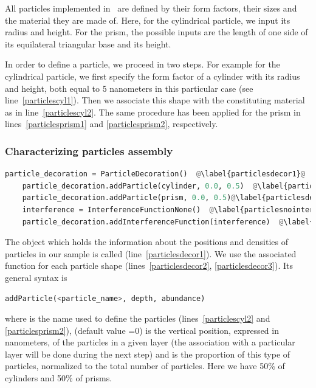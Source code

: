 All particles implemented in \BornAgain\ are defined by their
form factors, their sizes and the material
they are made of. Here, for the
cylindrical particle, we input its radius and height.  For the prism, 
the possible inputs are the length of one side of its equilateral triangular
base and its height.

In order to define a particle, we proceed in two steps. For example for
the cylindrical particle, we first specify the form factor of a cylinder with 
its radius and height, both equal to 5 nanometers in this particular
case (see line~\ref{particlescyl1}). Then we associate this shape with
the constituting material as in line~\ref{particlescyl2}.
The same procedure has been applied for the prism in lines~\ref{particlesprism1} and \ref{particlesprism2}, respectively.


%
\subsubsection{Characterizing particles assembly} 
\begin{lstlisting}[language=python, style=eclipseboxed, name=ex1,nolol]
    particle_decoration = ParticleDecoration()  @\label{particlesdecor1}@
    particle_decoration.addParticle(cylinder, 0.0, 0.5)  @\label{particlesdecor2}@
    particle_decoration.addParticle(prism, 0.0, 0.5)@\label{particlesdecor3}@
    interference = InterferenceFunctionNone()  @\label{particlesnointerf}@
    particle_decoration.addInterferenceFunction(interference)  @\label{particlesinterf}@
\end{lstlisting}
The object which holds the information about the positions and densities of particles
in our sample is called 
(line~\ref{particlesdecor1}). We use the associated function 
for each particle shape (lines~\ref{particlesdecor2}, \ref{particlesdecor3}). Its general syntax is 

\begin{lstlisting}[language=python, style=eclipse,numbers=none]
addParticle(<particle_name>, depth, abundance) 
\end{lstlisting}
where  is the name used to define the particles
(lines~\ref{particlescyl2} and \ref{particlesprism2}), 
(default value =0)
is the vertical position, expressed in nanometers, of the particles in a given layer (the
association with a particular layer will be done during the next step) and
 is the proportion of this type of particles, 
normalized to the total number of particles. Here we have 50\% of cylinders
and 50\% of prisms.

